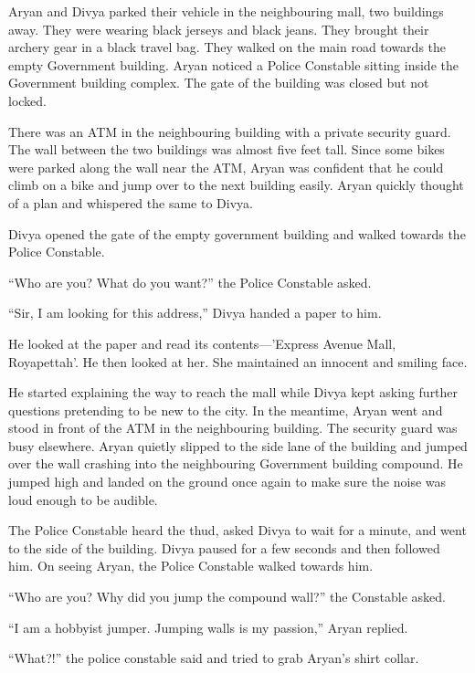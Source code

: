 Aryan and Divya parked their vehicle in the neighbouring mall, two buildings
away. They were wearing black jerseys and black jeans. They brought their
archery gear in a black travel bag. They walked on the main road towards the
empty Government building. Aryan noticed a Police Constable sitting inside the
Government building complex. The gate of the building was closed but not locked.

There was an ATM in the neighbouring building with a private security guard. The
wall between the two buildings was almost five feet tall. Since some bikes were
parked along the wall near the ATM, Aryan was confident that he could climb on a
bike and jump over to the next building easily. Aryan quickly thought of a plan
and whispered the same to Divya.

Divya opened the gate of the empty government building and walked towards the
Police Constable.

“Who are you? What do you want?” the Police Constable asked.

“Sir, I am looking for this address,” Divya handed a paper to him.

He looked at the paper and read its contents—'Express Avenue Mall,
Royapettah'. He then looked at her. She maintained an innocent and smiling face.

He started explaining the way to reach the mall while Divya kept asking further
questions pretending to be new to the city. In the meantime, Aryan went and
stood in front of the ATM in the neighbouring building. The security guard was
busy elsewhere. Aryan quietly slipped to the side lane of the building and
jumped over the wall crashing into the neighbouring Government building compound.
He jumped high and landed on the ground once again to make sure the noise was
loud enough to be audible.

The Police Constable heard the thud, asked Divya to wait for a minute, and went
to the side of the building. Divya paused for a few seconds and then followed
him. On seeing Aryan, the Police Constable walked towards him.

“Who are you? Why did you jump the compound wall?” the Constable asked.

“I am a hobbyist jumper. Jumping walls is my passion,” Aryan replied.

“What?!” the police constable said and tried to grab Aryan's shirt collar.

